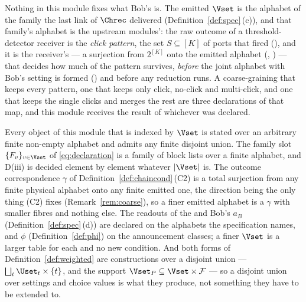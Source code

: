 
\begin{remark}\label{rem:alphabet}
Nothing in this module fixes what Bob's  is. The emitted
$\Vset$ is the alphabet of the family the last link of $\Chrec$ delivered
(Definition~\ref{def:spec}\,(c)), and that family's alphabet is the upstream
modules': the raw outcome of a threshold-detector receiver is the
\emph{click pattern}, the set $S\subseteq[K]$ of ports that fired
(), and it is the receiver's
 --- a surjection from $2^{[K]}$ onto the
emitted alphabet (,
) --- that decides how much of the pattern
survives, \emph{before} the joint alphabet with Bob's setting is formed
() and before any reduction runs. A
coarse-graining that keeps every pattern, one that keeps only click, no-click
and multi-click, and one that keeps the single clicks and merges the rest are
three declarations of that map, and this module receives the result of
whichever was declared.

Every object of this module that is indexed by $\Vset$ is stated over an
arbitrary finite non-empty alphabet and admits any finite disjoint union.
The family slot $\{F_v\}_{v\in\Vset}$ of \eqref{eq:declaration} is a family
of block lists over a finite alphabet, and D(iii) is decided element by
element whatever $|\Vset|$ is. The outcome correspondence $\gamma$ of
Definition~\ref{def:chaincond}\,(C2) is a total surjection from any finite
physical alphabet onto any finite emitted one, the direction being the only
thing (C2) fixes (Remark~\ref{rem:coarse}), so a finer emitted alphabet is a
$\gamma$ with smaller fibres and nothing else. The readouts of the
 and Bob's  $a_B$
(Definition~\ref{def:spec}\,(d))
are declared on the alphabets the specification names, and $\phi$
(Definition~\ref{def:phi}) on the announcement classes; a finer $\Vset$ is a
larger table for each and no new condition. And both forms of
Definition~\ref{def:weighted} are constructions over a disjoint union ---
$\bigsqcup_t\Uset_t\times\{t\}$, and the support $\Vset_P\subseteq
\Vset\times\mathcal{F}$ --- so a disjoint union over settings and choice
values is what they produce, not something they have to be extended to.


\end{remark}
